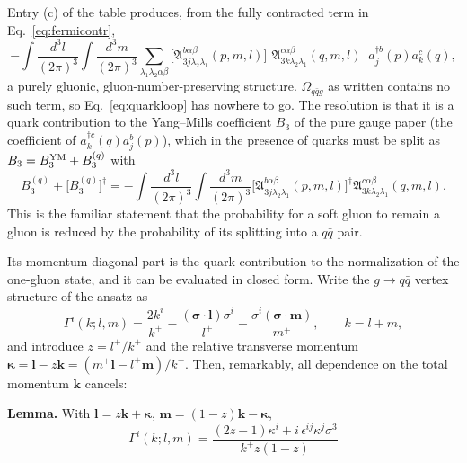 \documentclass[11pt]{article}
\newcommand{\mf}{\mathfrak}
\newcommand{\dg}{\dagger}
\newcommand{\ip}[1]{\int\!\frac{d^{3}#1}{(2\pi)^{3}}}
\newcommand{\OM}{\Omega}
\begin{document}
Entry (c) of the table produces, from the fully contracted term in Eq.~\eqref{eq:fermicontr},
\begin{equation}
-\ip{l}\ip{m}\sum_{\lambda_{1}\lambda_{2}\alpha\beta}
\Big[\mf A^{b\alpha\beta}_{3j\lambda_{2}\lambda_{1}}(p,m,l)\Big]^{\dg}
\mf A^{c\alpha\beta}_{3k\lambda_{2}\lambda_{1}}(q,m,l)\;\;a^{\dg b}_{j}(p)a^{c}_{k}(q),
\label{eq:quarkloop}
\end{equation}
a purely gluonic, gluon-number-preserving structure. $\OM_{q\bar qg}$ as written contains no such
term, so Eq.~\eqref{eq:quarkloop} has nowhere to go. The resolution is that it is a quark
contribution to the Yang--Mills coefficient $B_{3}$ of the pure gauge paper (the coefficient of
$a^{\dg c}_{k}(q)a^{b}_{j}(p)$), which in the presence of quarks must be split as
$B_{3}=B_{3}^{\rm YM}+B_{3}^{(q)}$ with
\begin{equation}
B_{3}^{(q)}+\big[B_{3}^{(q)}\big]^{\dg}
=-\ip{l}\ip{m}\Big[\mf A^{b\alpha\beta}_{3j\lambda_{2}\lambda_{1}}(p,m,l)\Big]^{\dg}
\mf A^{c\alpha\beta}_{3k\lambda_{2}\lambda_{1}}(q,m,l).
\end{equation}
This is the familiar statement that the probability for a soft gluon to remain a gluon is reduced
by the probability of its splitting into a $q\bar q$ pair.

Its momentum-diagonal part is the quark contribution to the normalization of the one-gluon state,
and it can be evaluated in closed form. Write the $g\to q\bar q$ vertex structure of the ansatz as
\begin{equation}
\Gamma^{i}(k;l,m)=\frac{2k^{i}}{k^{+}}-\frac{(\bm\sigma\!\cdot\!\bm l)\sigma^{i}}{l^{+}}
-\frac{\sigma^{i}(\bm\sigma\!\cdot\!\bm m)}{m^{+}},\qquad k=l+m,
\end{equation}
and introduce $z=l^{+}/k^{+}$ and the relative transverse momentum
$\bm\kappa=\bm l-z\bm k=(m^{+}\bm l-l^{+}\bm m)/k^{+}$. Then, remarkably, all dependence on the
total momentum $\bm k$ cancels:

\begin{res}
\textbf{Lemma.} With $\bm l=z\bm k+\bm\kappa$, $\bm m=(1-z)\bm k-\bm\kappa$,
\begin{equation}
\boxed{\;
\Gamma^{i}(k;l,m)=\frac{(2z-1)\kappa^{i}+i\,\epsilon^{ij}\kappa^{j}\sigma^{3}}{k^{+}z(1-z)}\;}
\label{eq:lemma}
\end{equation}
\end{res}
\end{document}
